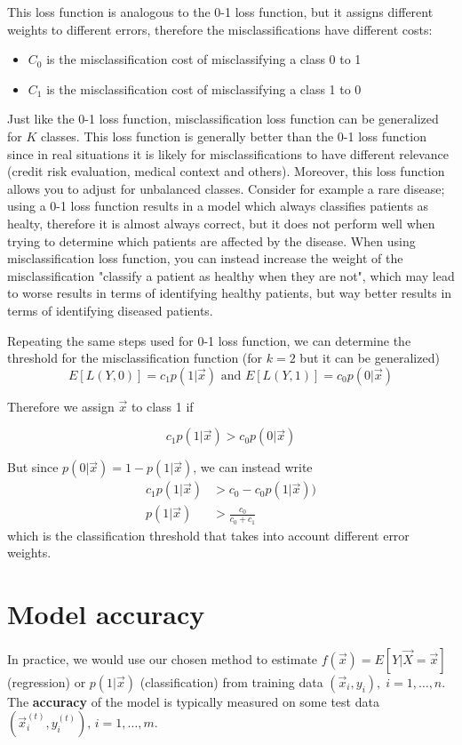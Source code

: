     This loss function is analogous to the 0-1 loss function, but it assigns different weights to different errors, therefore the misclassifications have different costs:
    \begin{itemize}
      \item $C_0$ is the misclassification cost of misclassifying a class 0 to 1
      \item $C_1$ is the misclassification cost of misclassifying a class 1 to 0
    \end{itemize}
    Just like the 0-1 loss function, misclassification loss function can be generalized for $K$ classes.
    This loss function is generally better than the 0-1 loss function since in real situations it is likely for misclassifications to have different relevance (credit risk evaluation, medical context and others). Moreover, this loss function allows you to adjust for unbalanced classes. Consider for example a rare disease; using a 0-1 loss function results in a model which always classifies patients as healty, therefore it is almost always correct, but it does not perform well when trying to determine which patients are affected by the disease. When using misclassification loss function, you can instead increase the weight of the misclassification "classify a patient as healthy when they are not", which may lead to worse results in terms of identifying healthy patients, but way better results in terms of identifying diseased patients.
    
    Repeating the same steps used for 0-1 loss function, we can determine the threshold for the misclassification function (for $k=2$ but it can be generalized)
    $$E[L(Y,0)] = c_1 p(1|\vec{x}) \text{ and } E[L(Y,1)] = c_0 p(0|\vec{x})$$
  
    Therefore we assign $\vec{x}$ to class 1 if 

    $$c_1 p(1|\vec{x}) > c_0 p(0|\vec{x})$$

    But since $p(0|\vec{x}) = 1 - p(1|\vec{x})$, we can instead write
    \begin{align*}
    c_1 p(1|\vec{x}) &> c_0 - c_0 p(1|\vec{x})) \\
    p(1|\vec{x}) &> \frac{c_0}{c_0 + c_1}
    \end{align*}
    which is the classification threshold that takes into account different error weights.

  \section{Model accuracy}
    In practice, we would use our chosen method to estimate $f(\vec{x})=E[Y|\vec{X}=\vec{x}]$ (regression) or $p(1|\vec{x})$ (classification) from training data $(\vec{x}_i, y_i), \; i = 1, \dots, n$.
    The \textbf{accuracy} of the model is typically measured on some test data 
    $(\vec{x}_i^{(t)}, y_i^{(t)}), \, i = 1, \dots, m $.

